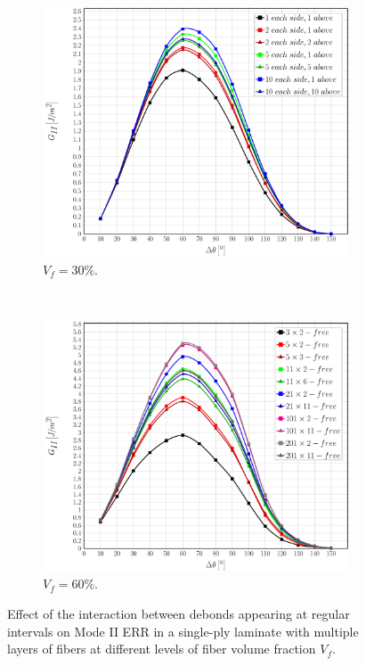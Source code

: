\documentclass[review]{elsarticle}
\begin{document}
\begin{figure}[!h]
\centering
    \begin{subfigure}[b]{0.475\textwidth}
        \includegraphics[width=\textwidth]{sideabovefibers-vf30-GII.pdf}
        \caption{$V_{f}=30\%$.}\label{subfig:sideabovefiber30MII}
    \end{subfigure} ~
   \begin{subfigure}[b]{0.475\textwidth}
        \includegraphics[width=\textwidth]{sideabovefibers-vf60-GII.pdf}
        \caption{$V_{f}=60\%$.}\label{subfig:sideabovefiber60MII}
    \end{subfigure}

\caption{Effect of the interaction between debonds appearing at regular intervals on Mode II ERR in a single-ply laminate with multiple layers of fibers at different levels of fiber volume fraction $V_{f}$.}\label{fig:sideabovefibersMII}
\end{figure}
\end{document}
